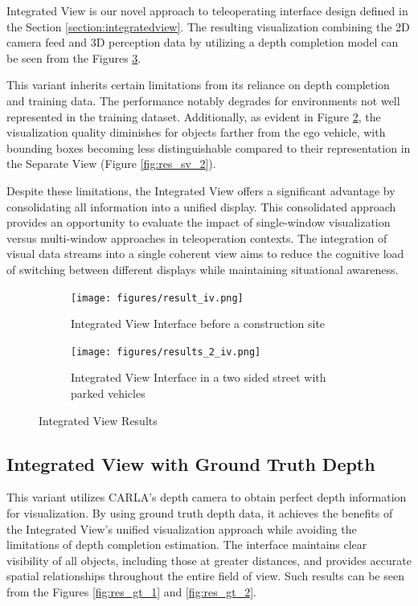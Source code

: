 Integrated View is our novel approach to teleoperating interface design defined in the Section \ref{section:integratedview}.
The resulting visualization combining the 2D camera feed and 3D perception data by utilizing a depth completion model can be seen from the Figures \ref{fig:res_iv}.

This variant inherits certain limitations from its reliance on depth completion and training data. The performance notably degrades for environments not well represented in the training dataset. Additionally, as evident in Figure \ref{fig:res_iv_2}, the visualization quality diminishes for objects farther from the ego vehicle, with bounding boxes becoming less distinguishable compared to their representation in the Separate View (Figure \ref{fig:res_sv_2}).

Despite these limitations, the Integrated View offers a significant advantage by consolidating all information into a unified display. This consolidated approach provides an opportunity to evaluate the impact of single-window visualization versus multi-window approaches in teleoperation contexts. The integration of visual data streams into a single coherent view aims to reduce the cognitive load of switching between different displays while maintaining situational awareness.

\begin{figure}[h]
    \centering
    \begin{subfigure}{0.8\textwidth}
        \texttt{[image: figures/result\_iv.png]}
        \centering
        \caption{Integrated View Interface before a construction site}
        \label{fig:res_iv_1}
    \end{subfigure}
    \begin{subfigure}{0.8\textwidth}
        \texttt{[image: figures/results\_2\_iv.png]}
        \centering
        \caption{Integrated View Interface in a two sided street with parked vehicles}
        \label{fig:res_iv_2}
    \end{subfigure}
    \caption{Integrated View Results}
    \label{fig:res_iv}
\end{figure}

\subsection*{Integrated View with Ground Truth Depth}
This variant utilizes CARLA's depth camera to obtain perfect depth information for visualization. By using ground truth depth data, it achieves the benefits of the Integrated View's unified visualization approach while avoiding the limitations of depth completion estimation. The interface maintains clear visibility of all objects, including those at greater distances, and provides accurate spatial relationships throughout the entire field of view. Such results can be seen from the Figures \ref{fig:res_gt_1} and \ref{fig:res_gt_2}.

